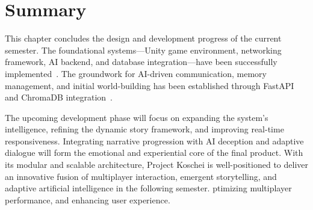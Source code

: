 \section{Summary}

This chapter concludes the design and development progress of the current semester. The foundational systems—Unity game environment, networking framework, AI backend, and database integration—have been successfully implemented~\cite{barri2016,chen2023}. The groundwork for AI-driven communication, memory management, and initial world-building has been established through FastAPI and ChromaDB integration~\cite{muludi2023,chandrasekhara2024}.

The upcoming development phase will focus on expanding the system's intelligence, refining the dynamic story framework, and improving real-time responsiveness. Integrating narrative progression with AI deception and adaptive dialogue will form the emotional and experiential core of the final product. With its modular and scalable architecture, Project Koschei is well-positioned to deliver an innovative fusion of multiplayer interaction, emergent storytelling, and adaptive artificial intelligence in the following semester.
ptimizing multiplayer performance, and enhancing user experience.

